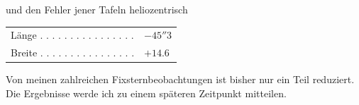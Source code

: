 \noindent und den Fehler jener Tafeln heliozentrisch

\begin{center}
\begin{tabular}{ll}
Länge . . . . . . . . . . . . . . . . & $-45''3$ \\
Breite . . . . . . . . . . . . . . . . & $+14.6$ \\
\end{tabular}
\end{center}

\par\indent Von meinen zahlreichen Fixsternbeobachtungen ist bisher nur ein Teil reduziert. Die Ergebnisse werde ich zu einem späteren Zeitpunkt mitteilen.
